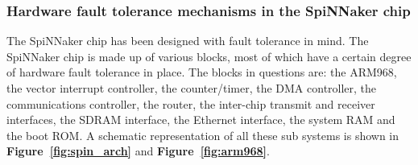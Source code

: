 \documentclass[a4paper, 11pt]{article}
\begin{document}
\subsubsection{Hardware fault tolerance mechanisms in the SpiNNaker chip}
The SpiNNaker chip has been designed with fault tolerance in mind. The SpiNNaker chip is made up of various blocks, most of which have a certain degree of hardware fault tolerance in place. The blocks in questions are: the ARM968, the vector interrupt controller, the counter/timer, the DMA controller, the communications controller, the router, the inter-chip transmit and receiver interfaces, the SDRAM interface, the Ethernet interface, the system RAM and the boot ROM. A schematic representation of all these sub systems is shown in \textbf{Figure~\ref{fig:spin_arch}} and \textbf{Figure~\ref{fig:arm968}}.
\end{document}
